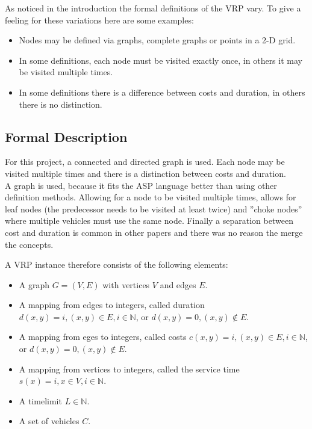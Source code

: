 \documentclass[12pt, letterpaper]{article}
\begin{document}
As noticed in the introduction the formal definitions of the VRP vary. To give a feeling for these variations here are some examples:
\begin{itemize}
	\item Nodes may be defined via graphs, complete graphs or points in a 2-D grid.
	\item In some definitions, each node must be visited exactly once, in others it may be visited multiple times.
	\item In some definitions there is a difference between costs and duration, in others there is no distinction.
\end{itemize}

\subsection{Formal Description}
For this project, a connected and directed graph is used. Each node may be visited multiple times and there is a distinction between costs and duration.\\
A graph is used, because it fits the ASP language better than using other definition methods. Allowing for a node to be visited multiple times, allows for leaf nodes (the predecessor needs to be visited at least twice) and ''choke nodes'' where multiple vehicles must use the same node. Finally a separation between cost and duration is common in other papers and there was no reason the merge the concepts.

A VRP instance therefore consists of the following elements:
\begin{itemize}
	\item A graph $G = (V,E)$ with vertices $V$ and edges $E$.
	\item A mapping from edges to integers, called duration $d(x,y) = i, (x,y) \in E, i \in \mathbb{N}$, or $d(x,y) = 0, (x,y) \notin E$.
	\item A mapping from eges to integers, called costs $c(x,y) = i, (x,y) \in E, i \in \mathbb{N}$, or $d(x,y) = 0, (x,y) \notin E$.
	\item A mapping from vertices to integers, called the service time $s(x) = i, x \in V, i \in \mathbb{N}$.
	\item A timelimit $L \in \mathbb{N}$.
	\item A set of vehicles $C$.
\end{itemize}
\end{document}
